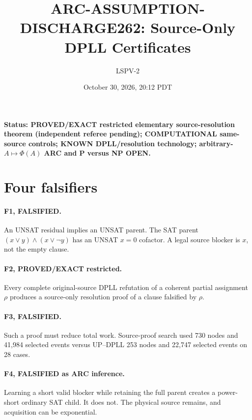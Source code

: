 \documentclass[11pt]{article}
\title{ARC-ASSUMPTION-DISCHARGE262: Source-Only DPLL Certificates}
\author{LSPV-2}
\date{October 30, 2026, 20:12 PDT}
\begin{document}
\maketitle
\noindent\textbf{Status: PROVED/EXACT restricted elementary source-resolution theorem (independent referee pending); COMPUTATIONAL same-source controls; KNOWN DPLL/resolution technology; arbitrary-$A\mapsto\Phi(A)$ ARC and P versus NP OPEN.}
\section{Four falsifiers}
\paragraph{F1, FALSIFIED.} An UNSAT residual implies an UNSAT parent. The SAT parent $(x\vee y)\wedge(x\vee\neg y)$ has an UNSAT $x=0$ cofactor. A legal source blocker is $x$, not the empty clause.
\paragraph{F2, PROVED/EXACT restricted.} Every complete original-source DPLL refutation of a coherent partial assignment $\rho$ produces a source-only resolution proof of a clause falsified by $\rho$.
\paragraph{F3, FALSIFIED.} Such a proof must reduce total work. Source-proof search used 730 nodes and 41,984 selected events versus UP--DPLL 253 nodes and 22,747 selected events on 28 cases.
\paragraph{F4, FALSIFIED as ARC inference.} Learning a short valid blocker while retaining the full parent creates a power-short ordinary SAT child. It does not. The physical source remains, and acquisition can be exponential.
\end{document}
